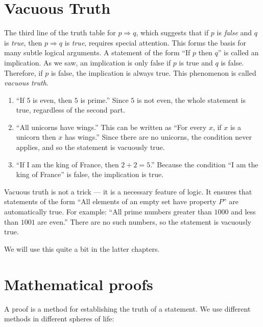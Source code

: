 \section{Vacuous Truth}

The third line of the truth table for $p \Rightarrow q$, which suggests that if $p$ is {\em false} and $q$ is {\em true}, then   $p \Rightarrow q$ is {\em true}, requires special attention. This forms the basis for
many subtle logical arguments.
A statement of the form ``If $p$ then $q$'' is called an implication.  
As we saw, an implication is only false if $p$ is true and $q$ is false.  
Therefore, if $p$ is false, the implication is always true.  
This phenomenon is called \emph{vacuous truth}.  

\begin{example}
\begin{enumerate}
  \item ``If $5$ is even, then $5$ is prime.''  
        Since $5$ is not even, the whole statement is true, regardless of the second part.
  \item ``All unicorns have wings.''  
        This can be written as ``For every $x$, if $x$ is a unicorn then $x$ has wings.''  
        Since there are no unicorns, the condition never applies, and so the statement is vacuously true.
  \item ``If I am the king of France, then $2+2=5$.''  
        Because the condition ``I am the king of France'' is false, the implication is true.
\end{enumerate}
\end{example}

Vacuous truth is not a trick — it is a necessary feature of logic.  
It ensures that statements of the form ``All elements of an empty set have property $P$'' 
are automatically true.  
For example: ``All prime numbers greater than $1000$ and less than $1001$ are even.''  
There are no such numbers, so the statement is vacuously true. 

We will use this quite a bit in the latter chapters.

\section{Mathematical proofs}

A proof is a method for establishing the truth of a statement.  We use different methods in different spheres of life:

